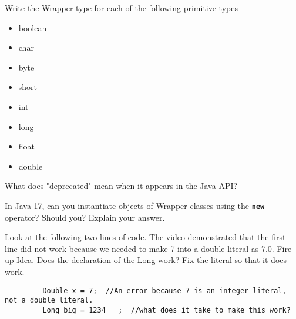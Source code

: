\documentclass[letterpaper,12pt]{exam}
\begin{document}
\begin{questions}
\begin{samepage}
    \question Write the Wrapper type for each of the following primitive types
      \begin{itemize}
        \item boolean
        \vspace{5mm}
        \item char
        \vspace{5mm}
        \item byte
        \vspace{5mm}
        \item short 
        \vspace{5mm}
        \item int
        \vspace{5mm}
        \item long
        \vspace{5mm}
        \item float
        \vspace{5mm}
        \item double
        \vspace{5mm}
       \end{itemize}
\end{samepage}

\begin{samepage}
    \question What does "deprecated" mean when it appears in the Java API?
    \vspace{5mm}
\end{samepage}

\begin{samepage}
    \question In Java 17, can you instantiate objects of Wrapper classes using the \texttt{\textbf{new}} operator?  Should you?  Explain your answer.
    \vspace{5mm}
\end{samepage}

\begin{samepage}
    \question Look at the following two lines of code.  The video demonstrated that the first line did not work because we needed to make 7 into a double literal as 7.0.  Fire up Idea.  Does the declaration of the Long work?  Fix the literal so that it does work.
    \begin{verbatim}
         Double x = 7;  //An error because 7 is an integer literal, not a double literal.        
         Long big = 1234   ;  //what does it take to make this work?
        \end{verbatim}
    \vspace{5mm}
\end{samepage}



\end{questions}
\end{document}

